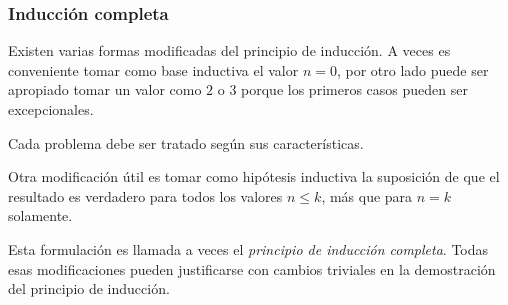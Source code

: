 \documentclass[handout]{beamer} %
\begin{document}
\begin{frame}
    \frametitle{Inducción completa}
	Existen varias formas modificadas del principio de inducción. A veces es conveniente tomar como base inductiva el valor $n=0$, por otro lado puede ser apropiado tomar un valor como $2$ o $3$ porque los primeros casos pueden ser excepcionales. 
	\pause
	\medskip
	
	Cada problema debe ser tratado según sus características. 
	\pause
	\medskip
	
	Otra modificación útil es tomar como hipótesis inductiva la suposición de que el resultado es verdadero para todos los valores $n\le k$, más que para $n=k$ solamente.
	\pause
	\medskip
	
	Esta formulación es llamada a veces el {\it principio de inducción completa}. Todas esas modificaciones pueden justificarse con cambios triviales en la demostración del principio de inducción.
	
\end{frame}

\end{document}
